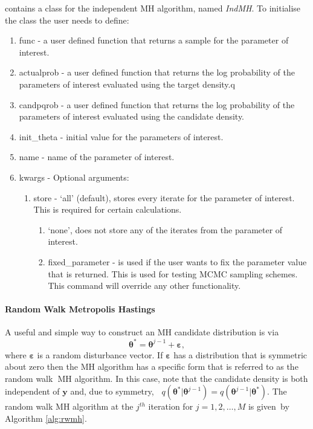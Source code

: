 \documentclass[article]{jss}
\begin{document}
 contains a class for the independent MH algorithm, named \emph{IndMH}.
To initialise the class the user needs to define: 
\begin{enumerate}
\item func - a user defined function that returns a sample for the
  parameter of interest.
\item actualprob - a user defined function that returns the log
  probability of the parameters of interest evaluated using the target
  density.q
\item candpqrob - a user defined function that returns the log
  probability of the parameters of interest evaluated using the
  candidate density.
\item init\_theta - initial value for the parameters of interest.
\item name - name of the parameter of interest.
\item kwargs - Optional arguments:

\begin{enumerate}
\item store - `all' (default), stores every iterate for the parameter
  of interest. This is required for certain calculations.

  \begin{enumerate}
  \item `none', does not store any of the iterates from the parameter
    of interest.
  \item fixed\_parameter - is used if the user wants to fix the
    parameter value that is returned. This is used for testing MCMC
    sampling schemes.  This command will override any other
    functionality.
  \end{enumerate}
\end{enumerate}
\end{enumerate}

\paragraph{Random Walk Metropolis Hastings \protect \protect \\
}

A useful and simple way to construct an MH candidate distribution is
via\begin{equation}
  \bm{\theta}^{\ast}=\bm{\theta}^{j-1}+\bm{\bm{\varepsilon}},\label{random
    walk candidate}\end{equation} where $\bm{\varepsilon}$ is a random
disturbance vector. If $\bm{\varepsilon}$ has a distribution that is
symmetric about zero then the MH algorithm has a specific form that is
referred to as the random walk\textbf{\ }MH algorithm. In this case,
note that the candidate density is both independent of $\bm{y}$ and,
due to symmetry, \textbf{\
}$q\left(\bm{\theta}^{\ast}|\bm{\theta}^{j-1}\right)=q\left(\bm{\theta}^{j-1}|\bm{\theta}^{\ast}\right)$.
The random walk MH algorithm at the $j^{th}$ iteration for
$j=1,2,\ldots,M$ is given\emph{\ }by Algorithm \ref{alg:rwmh}.
\end{document}
